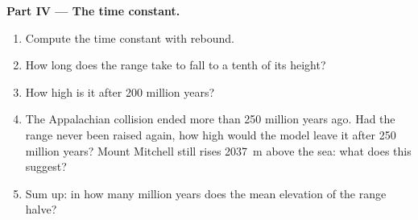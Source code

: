 \begin{problem}
\medskip
\noindent\textbf{Part IV --- The time constant.}
\begin{enumerate}[resume]
  \item Compute the time constant with rebound.
  \item How long does the range take to fall to a tenth of its height?
  \item How high is it after 200 million years?
  \item The Appalachian collision ended more than 250 million years ago.
        Had the range never been raised again, how high would the model leave
        it after 250 million years? Mount Mitchell still rises \qty{2037}{m}
        above the sea: what does this suggest?
  \item Sum up: in how many million years does the mean elevation of the
        range halve?
\end{enumerate}
\end{problem}
